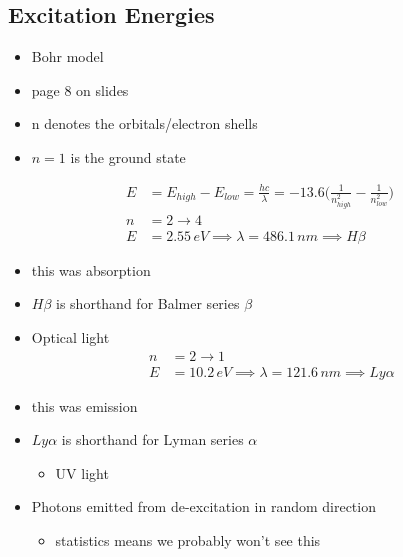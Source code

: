 \documentclass[a4paper,11pt,normalem]{article}
\begin{document}
\section{}

\subsection{Excitation Energies}
\begin{itemize}
    \item Bohr model
    \item page 8 on slides
    \item n denotes the orbitals/electron shells
    \item $n = 1$ is the ground state
\end{itemize}

\begin{align*}
    E &= E_{high} - E_{low} = \frac{hc}{\lambda} = -13.6\Big(\frac{1}{n_{high}^2} - \frac{1}{n_{low}^2} \Big) \\
    n &= 2 \to 4 \\
    E &= 2.55\,eV \implies \lambda = 486.1\,nm \implies H\beta
\end{align*}

\begin{itemize}
    \item this was absorption
    \item \(H\beta\) is shorthand for Balmer series \(\beta\)
    \item Optical light
        \begin{align*}
            n &= 2 \to 1 \\
            E &= 10.2\,eV \implies \lambda = 121.6\,nm \implies Ly\alpha
        \end{align*}
    \item this was emission
    \item\(Ly\alpha\) is shorthand for Lyman series \(\alpha\)
          \begin{itemize}
            \item UV light
          \end{itemize}
    \item Photons emitted from de-excitation in random direction
        \begin{itemize}
            \item statistics means we probably won't see this
        \end{itemize}
\end{itemize}
\end{document}
